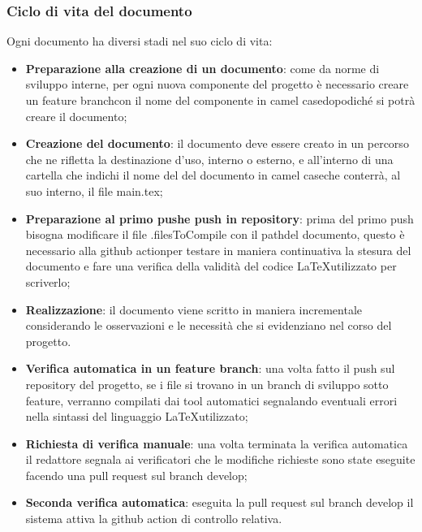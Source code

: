 \subsubsection{Ciclo di vita del documento}
Ogni documento ha diversi stadi nel suo ciclo di vita:
\begin{itemize}
  \item \textbf{Preparazione alla creazione di un documento}: come da norme di
  sviluppo interne, per ogni nuova componente del progetto \`e necessario creare un
  feature branch\glo con il nome del componente in camel case\glo dopodich\'e
  si potr\`a creare il documento;

  \item \textbf{Creazione del documento}: il documento deve essere creato in un
  percorso che ne rifletta la destinazione d'uso, interno o esterno, e
  all'interno di una cartella che indichi il nome del del documento in
  camel case\glo che conterr\`a, al suo interno, il file main.tex;

  \item \textbf{Preparazione al primo push\glo e push in repository\glo}: prima del primo
   push bisogna modificare il file .filesToCompile con il path\glo del documento,
   questo \`e necessario alla github action\glo per testare in maniera continuativa
   la stesura del documento e fare una verifica della validit\`a del codice
   \LaTeX \space utilizzato per scriverlo;

  \item \textbf{Realizzazione}: il documento viene scritto in maniera incrementale
  considerando le osservazioni e le necessit\`a che si evidenziano nel corso del
  progetto.

  \item \textbf{Verifica automatica in un feature branch}: una volta fatto il push
  sul repository del progetto, se i file si trovano in un branch di sviluppo
  sotto feature, verranno compilati dai tool automatici segnalando eventuali errori
  nella sintassi del linguaggio \LaTeX \space utilizzato;

  \item \textbf{Richiesta di verifica manuale}: una volta terminata la verifica
  automatica il redattore segnala ai verificatori che le modifiche richieste
  sono state eseguite facendo una pull request sul branch develop;

  \item \textbf{Seconda verifica automatica}: eseguita la pull request sul branch
  develop il sistema attiva la github action di controllo relativa.


\end{itemize}
